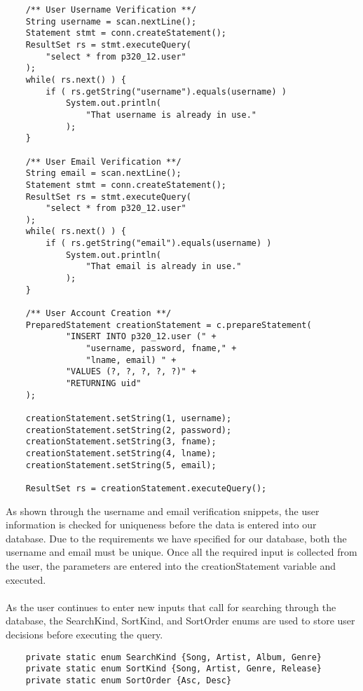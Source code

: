 \documentclass[12pt]{article}
\begin{document}
    \begin{lstlisting}
    /** User Username Verification **/
    String username = scan.nextLine();
    Statement stmt = conn.createStatement();
    ResultSet rs = stmt.executeQuery(
        "select * from p320_12.user"
    );
    while( rs.next() ) {
        if ( rs.getString("username").equals(username) )
            System.out.println(
                "That username is already in use."
            );
    }

    /** User Email Verification **/
    String email = scan.nextLine();
    Statement stmt = conn.createStatement();
    ResultSet rs = stmt.executeQuery(
        "select * from p320_12.user"
    );
    while( rs.next() ) {
        if ( rs.getString("email").equals(username) )
            System.out.println(
                "That email is already in use."
            );
    }

    /** User Account Creation **/
    PreparedStatement creationStatement = c.prepareStatement(
            "INSERT INTO p320_12.user (" +
                "username, password, fname," +
                "lname, email) " +
            "VALUES (?, ?, ?, ?, ?)" +
            "RETURNING uid"
    );

    creationStatement.setString(1, username);
    creationStatement.setString(2, password);
    creationStatement.setString(3, fname);
    creationStatement.setString(4, lname);
    creationStatement.setString(5, email);

    ResultSet rs = creationStatement.executeQuery();
    \end{lstlisting}
    As shown through the username and email verification snippets,
    the user information is checked for uniqueness before the data
    is entered into our database. Due to the requirements we have
    specified for our database, both the username and email must be
    unique. Once all the required input is collected from the user,
    the parameters are entered into the creationStatement variable and
    executed.
    \\~\\
    As the user continues to enter new inputs that call for searching
    through the database, the SearchKind, SortKind, and SortOrder enums
    are used to store user decisions before executing the query.
    \begin{lstlisting}
    private static enum SearchKind {Song, Artist, Album, Genre}
    private static enum SortKind {Song, Artist, Genre, Release}
    private static enum SortOrder {Asc, Desc}
    \end{lstlisting}
\end{document}

